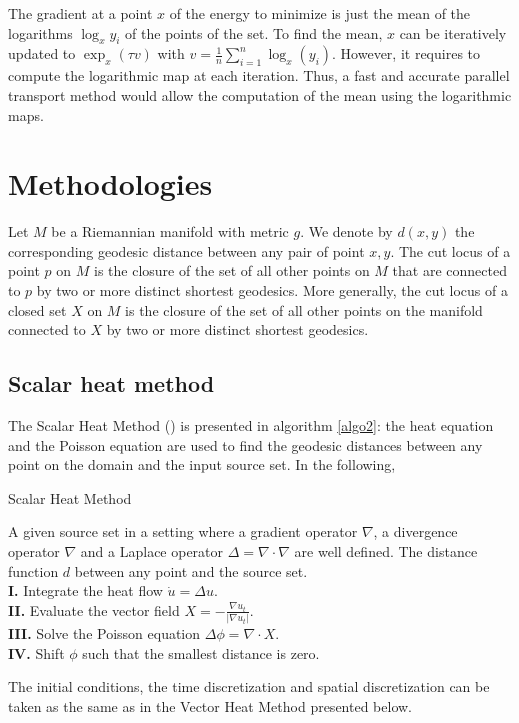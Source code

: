 \documentclass[sigconf, nonacm]{acmart}
\begin{document}
The gradient at a point $x$ of the energy to minimize is just the mean of the logarithms $\log_x y_i$ of the points of the set. To find the mean, $x$ can be iteratively updated to $\exp_{x}(\tau v)$ with $v=\frac{1}{n}\sum_{i=1}^{n}\log_x(y_i)$. However, it requires to compute the logarithmic map at each iteration. Thus, a fast and accurate parallel transport method would allow the computation of the mean using the logarithmic maps.


\section{Methodologies}
Let $M$ be a Riemannian manifold with metric $g$. We denote by $d(x,y)$ the corresponding geodesic distance between any pair of point $x,y$. 
The cut locus of a point $p$ on $M$ is the closure of the set of all other points on $M$ that are connected to $p$
by two or more distinct shortest geodesics. More generally, the cut locus of a closed set $X$ on $M$ is the closure of the set of 
all other points on the manifold connected to $X$ by two or more distinct shortest geodesics.

\subsection{Scalar heat method}
The Scalar Heat Method (\cite{Crane:2017:HMD}) is presented in algorithm \ref{algo2}: the heat equation and the Poisson equation are used to find the geodesic distances
between any point on the domain and the input source set. In the following, 

\begin{algorithm}
  \caption{Scalar Heat Method} \label{algo2}
  \begin{algorithmic}
    \Require A given source set in a setting where a gradient operator $\nabla$, a divergence operator $\nabla$ and a Laplace operator $\Delta = \nabla \cdot \nabla$ 
    are well defined. 
    \Ensure The distance function $d$ between any point and the source set. \\
    \noindent \textbf{I.} Integrate the heat flow $\dot{u} = \Delta u.$\\
    \textbf{II. }Evaluate the vector field $X = -\frac{\nabla u_t}{|\nabla u_t|}.$ \\
    \textbf{III. }Solve the Poisson equation $\Delta \phi = \nabla \cdot X. $\\
    \textbf{IV. } Shift $\phi$ such that the smallest distance is zero. \\
  \end{algorithmic}
\end{algorithm}
The initial conditions, the time discretization and spatial discretization can be taken as the same as in the Vector Heat Method presented below. 
\end{document}
